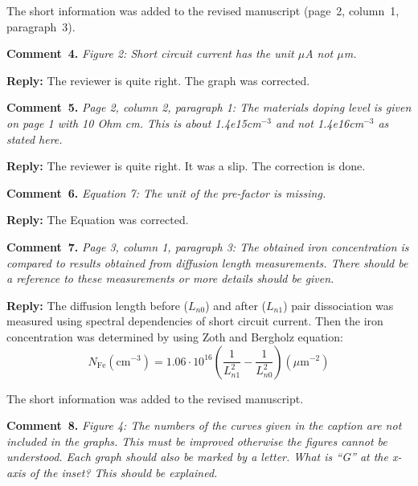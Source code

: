 \documentclass[aip,jap,preprint]{revtex4-1}
\begin{document}
The short information was added to the revised manuscript (page~2, column~1, paragraph~3).


\vspace{1cm}
\noindent
\textcolor[rgb]{0.00,0.50,1.00}{\textbf{Comment~4.}}
\emph{Figure 2: Short circuit current has the unit $\mu$A not $\mu$m.}

\noindent
\textcolor[rgb]{0.51,0.00,0.00}{\textbf{Reply:}}
The reviewer is quite right.
The graph was corrected.


\vspace{1cm}
\noindent
\textcolor[rgb]{0.00,0.50,1.00}{\textbf{Comment~5.}}
\emph{Page 2, column 2, paragraph 1: The materials doping level is given on page 1 with 10 Ohm cm. This is about 1.4e15cm$^{-3}$ and not 1.4e16cm$^{-3}$ as stated here.}

\noindent
\textcolor[rgb]{0.51,0.00,0.00}{\textbf{Reply:}}
The reviewer is quite right.
It was a slip.
The correction is done.


\vspace{1cm}
\noindent
\textcolor[rgb]{0.00,0.50,1.00}{\textbf{Comment~6.}}
\emph{Equation 7: The unit of the pre-factor is missing. }

\noindent
\textcolor[rgb]{0.51,0.00,0.00}{\textbf{Reply:}}
The Equation was corrected.

\vspace{1cm}
\noindent
\textcolor[rgb]{0.00,0.50,1.00}{\textbf{Comment~7.}}
\emph{Page 3, column 1, paragraph 3: The obtained iron concentration is compared to results obtained from diffusion length measurements. There should be a reference to these measurements or more details should be given.}

\noindent
\textcolor[rgb]{0.51,0.00,0.00}{\textbf{Reply:}}
The diffusion length before ($L_{n0}$) and after ($L_{n1}$) pair dissociation was measured using spectral dependencies of short circuit current\cite{LnIscMethod}.
Then the iron concentration was determined by using Zoth and Bergholz\cite{FeB_Zong} equation:
\begin{equation}
  N_\mathrm{Fe}(\mathrm{cm}^{-3})=1.06\cdot10^{16}\left(\frac{1}{L_{n1}^2}-\frac{1}{L_{n0}^2}\right)(\mu\mathrm{m}^{-2})
\end{equation}

The short information was added to the revised manuscript.

\vspace{1cm}
\noindent
\textcolor[rgb]{0.00,0.50,1.00}{\textbf{Comment~8.}}
\emph{Figure 4: The numbers of the curves given in the caption are not included in the graphs. This must be improved otherwise the figures cannot be understood. Each graph should also be marked by a letter. What is ``G'' at the x-axis of the inset? This should be explained. }
\end{document}
